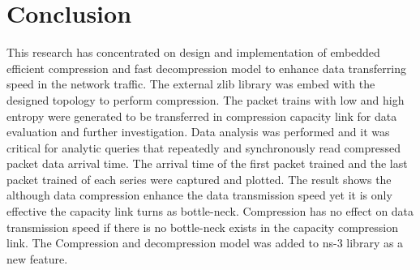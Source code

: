\documentclass[sigconf]{acmart}
\begin{document}
\section{Conclusion}
This research has concentrated on design and implementation of  embedded efficient compression and fast decompression model to enhance data transferring speed in the network traffic. The external zlib library was embed with the designed topology to perform compression. The packet trains with low and high entropy were generated to be transferred in compression capacity link for data evaluation and further investigation. Data analysis was performed and it was critical for analytic queries that repeatedly and synchronously read compressed packet data arrival time. The arrival time of the first packet trained and the last packet trained of each series were captured and plotted. The result shows the although data compression enhance the data transmission speed yet it is only effective the capacity link turns as bottle-neck. Compression has no effect on data transmission speed if there is no bottle-neck exists in the capacity compression link. The Compression and decompression model was added to ns-3 library as a new feature. 





\end{document}
